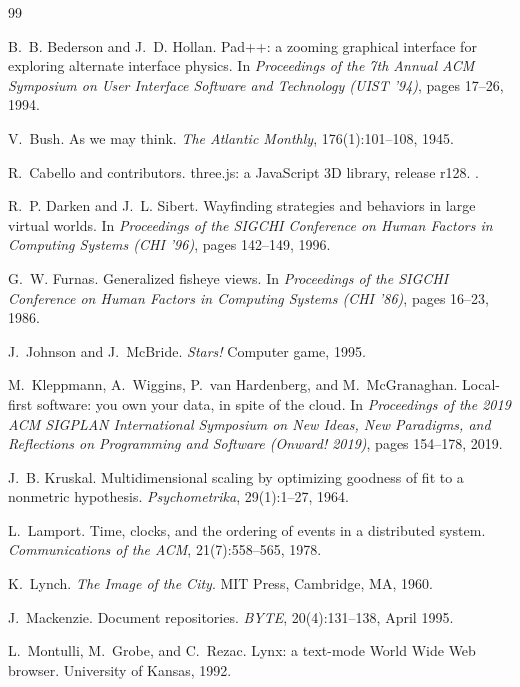 \documentclass[11pt]{article}
\theoremstyle{remark}
\begin{document}
\begin{thebibliography}{99}\small

B.~B. Bederson and J.~D. Hollan.
\newblock Pad++: a zooming graphical interface for exploring alternate interface physics.
\newblock In \emph{Proceedings of the 7th Annual ACM Symposium on User Interface Software and Technology (UIST '94)}, pages 17--26, 1994.

V.~Bush.
\newblock As we may think.
\newblock \emph{The Atlantic Monthly}, 176(1):101--108, 1945.

R.~Cabello and contributors.
\newblock three.js: a JavaScript 3D library, release r128.
.

R.~P. Darken and J.~L. Sibert.
\newblock Wayfinding strategies and behaviors in large virtual worlds.
\newblock In \emph{Proceedings of the SIGCHI Conference on Human Factors in Computing Systems (CHI '96)}, pages 142--149, 1996.

G.~W. Furnas.
\newblock Generalized fisheye views.
\newblock In \emph{Proceedings of the SIGCHI Conference on Human Factors in Computing Systems (CHI '86)}, pages 16--23, 1986.

J.~Johnson and J.~McBride.
\newblock \emph{Stars!}
\newblock Computer game, 1995.

M.~Kleppmann, A.~Wiggins, P.~van Hardenberg, and M.~McGranaghan.
\newblock Local-first software: you own your data, in spite of the cloud.
\newblock In \emph{Proceedings of the 2019 ACM SIGPLAN International Symposium on New Ideas, New Paradigms, and Reflections on Programming and Software (Onward! 2019)}, pages 154--178, 2019.

J.~B. Kruskal.
\newblock Multidimensional scaling by optimizing goodness of fit to a nonmetric hypothesis.
\newblock \emph{Psychometrika}, 29(1):1--27, 1964.

L.~Lamport.
\newblock Time, clocks, and the ordering of events in a distributed system.
\newblock \emph{Communications of the ACM}, 21(7):558--565, 1978.

K.~Lynch.
\newblock \emph{The Image of the City}.
\newblock MIT Press, Cambridge, MA, 1960.

J.~Mackenzie.
\newblock Document repositories.
\newblock \emph{BYTE}, 20(4):131--138, April 1995.

L.~Montulli, M.~Grobe, and C.~Rezac.
\newblock Lynx: a text-mode World Wide Web browser.
\newblock University of Kansas, 1992.


\end{thebibliography}
\end{document}
